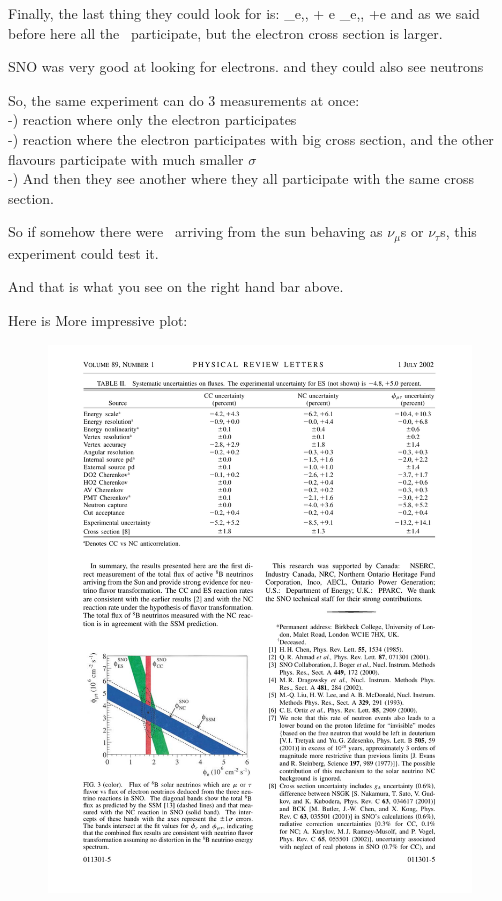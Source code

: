 {Finally,  the last thing they could look for is:
\be
\nu_{e,\mu,\tau} + e  \rightarrow \nu_{e,\mu,\tau} +e
\ee
and as we said before here all the \nus\ participate, but the electron cross section is larger.

SNO was very good at looking for electrons. and they could also see neutrons

So, the same experiment can do 3 measurements at once:\\
 -) reaction where only the electron participates\\
 -) reaction where the electron participates with big cross section, and the other flavours participate with much smaller $\sigma$\\
 -) And then they see another where they all participate with the same cross section. 


So if somehow there were \nus\ arriving from the sun behaving as $\nu_\mu$s or $\nu_\tau$s, this experiment could test it. 

And that is what you see on the right hand bar  above. 

Here is More impressive plot: 

\begin{figure}[h!]
\centering
\includegraphics[width=1.0\textwidth]{./SNOResult.pdf}
\end{figure}

}
